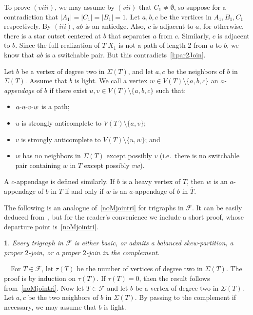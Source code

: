 \documentclass[11 pt] {article}
\newcommand\blackslug{\hbox{\hskip 1pt \vrule width 4pt height 8pt depth 1.5pt
        \hskip 1pt}}
\newcommand\bbox{\hfill \quad \blackslug \medbreak}
\def\d{\hbox{-}}
\newtheorem{theorem}{}[section]
\newcounter{claim}
\newcommand{\Proof}{\setcounter{claim}{0}\noindent{\bf Proof.}\ \ }
\begin{document}
To prove $(viii)$, we may assume by $(vii)$ that $C_1 \neq \emptyset$,
so suppose for a contradiction that $|A_1|=|C_1|=|B_1|=1$.  Let $a, b,
c$ be the vertices in $A_1, B_1, C_1$ respectively.  By $(iii)$, $ab$
is an antiedge.  Also, $c$ is adjacent to $a$, for otherwise, there is
a star cutset centered at $b$ that separates $a$ from $c$. Similarly,
$c$ is adjacent to $b$.  Since the full realization of $T|X_1$ is not
a path of length 2 from $a$ to $b$, we know that $ab$ is a switchable
pair.  But this contradicts~\ref{l:par2Join}.
\bbox



Let $b$ be a vertex of degree two in $\Sigma(T)$, and let $a,c$ be the
neighbors of $b$ in $\Sigma(T)$. Assume that $b$ is light. We call a
vertex $w \in V(T) \setminus \{a, b, c\}$ an {\em $a$-appendage} of
$b$ if there exist $u,v \in V(T) \setminus \{a,b,c\}$ such that:
\begin{itemize}
\item $a \d u \d v \d w$ is a path;
\item $u$ is strongly anticomplete to $V(T) \setminus \{a,v\}$;
\item $v$ is strongly anticomplete to $V(T) \setminus \{u,w\}$; and
\item $w$ has no neighbors in $\Sigma(T)$ except possibly $v$ (i.e.\
  there is no switchable pair containing $w$ in $T$ except possibly
  $vw$).
\end{itemize}

A $c$-appendage is defined similarly. If $b$ is a heavy vertex of $T$,
then $w$ is an $a$-appendage of $b$ in $T$ if and only if $w$ is an
$a$-appendage of $b$ in $\overline{T}$.

The following is an analogue of~\ref{noMjointri} for trigraphs in $\mathcal{F}$.  It can 
be easily deduced from~\cite{thesis}, but for the reader's convenience we include a
short proof, whose departure point is~\ref{noMjointri}.

\begin{theorem}
  \label{structure}
  Every trigraph in $\mathcal{F}$ is either basic, or admits a
  balanced skew-partition, a proper $2$-join, or a proper $2$-join
  in the complement.
\end{theorem}

\Proof For $T \in \mathcal{F}$, let $\tau(T)$ be the number of
vertices of degree two in $\Sigma(T)$. The proof is by induction on
$\tau(T)$. If $\tau(T)=0$, then the result follows
from~\ref{noMjointri}. Now let $T \in \mathcal{F}$ and let $b$ be a
vertex of degree two in $\Sigma(T)$. Let $a,c$ be the two neighbors of
$b$ in $\Sigma(T)$. By passing to the complement if necessary, we may
assume that $b$ is light.
\end{document}
